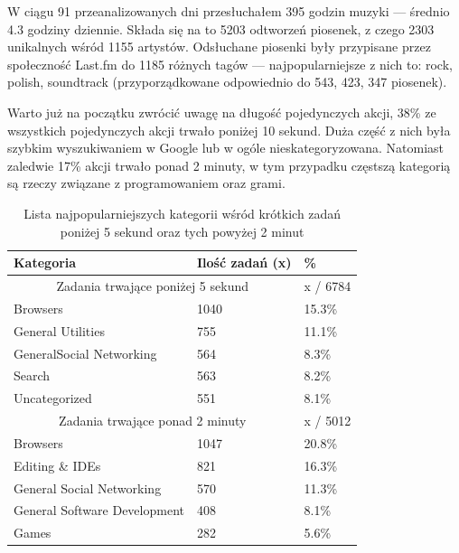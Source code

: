 \documentclass[openright]{xmgr}
\begin{document}
	W ciągu 91 przeanalizowanych dni przesłuchałem 395 godzin muzyki — średnio 4.3 godziny dziennie.
	Składa się na to 5203 odtworzeń piosenek, z czego 2303 unikalnych wśród 1155 artystów.
	Odsłuchane piosenki były przypisane przez społeczność Last.fm do 1185 różnych tagów — najpopularniejsze z nich to: rock, polish, soundtrack
	(przyporządkowane odpowiednio do 543, 423, 347 piosenek).

	Warto już na początku zwrócić uwagę na długość pojedynczych akcji, 38\% ze wszystkich pojedynczych akcji trwało poniżej 10 sekund.
	Duża część z nich była szybkim wyszukiwaniem w Google lub w ogóle nieskategoryzowana.
	Natomiast zaledwie 17\% akcji trwało ponad 2 minuty, w tym przypadku częstszą kategorią są rzeczy związane z programowaniem oraz grami.

	    \begin{table}[]
        \centering
        \begin{tabular}{|l|l|l|}
            \hline
            Kategoria                           & Ilość zadań (x)   & \%      \\ \hline
            \multicolumn{2}{|c|}{Zadania trwające poniżej 5 sekund} & x / 6784\\ \hline
            Browsers                            & 1040              & 15.3\%  \\ \hline
            General Utilities                   & 755               & 11.1\%  \\ \hline
            GeneralSocial Networking            & 564               & 8.3\%   \\ \hline
            Search                              & 563               & 8.2\%   \\ \hline
            Uncategorized                       & 551               & 8.1\%   \\ \hline
            \multicolumn{2}{|c|}{Zadania trwające ponad 2 minuty}   & x / 5012\\ \hline
            Browsers                            & 1047              & 20.8\%  \\ \hline
            Editing \& IDEs                     & 821               & 16.3\%  \\ \hline
            General Social Networking           & 570               & 11.3\%  \\ \hline
            General Software Development        & 408               & 8.1\%   \\ \hline
            Games                               & 282               & 5.6\%   \\ \hline
        \end{tabular}
        \caption{Lista najpopularniejszych kategorii wśród krótkich zadań poniżej 5 sekund oraz tych powyżej 2 minut}
        \label{Zadania krótkie i długie, które są najpopularniejsze?}
        \end{table}
\end{document}
